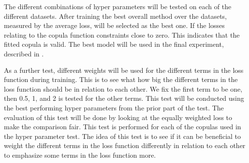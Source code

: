 
The different combinations of hyper parameters will be tested on each of the different datasets. After training the best overall method over the datasets, measured by the average loss, will be selected as the best one. If the losses relating to the copula function constraints close to zero. This indicates that the fitted copula is valid. The best model will be used in the final experiment, described in .  

As a further test, different weights will be used for the different terms in the loss function during training. This is to see what how big the different terms in the loss function should be in relation to each other. We fix the first term to be one, then 0.5, 1, and 2 is tested for the other terms. This test will be conducted using the best performing hyper parameters from the prior part of the test. The evaluation of this test will be done by looking at the equally weighted loss to make the comparison fair. This test is performed for each of the copulas used in the hyper parameter test. The idea of this test is to see if it can be beneficial to weight the different terms in the loss function differently in relation to each other to emphasize some terms in the loss function more. 

 


